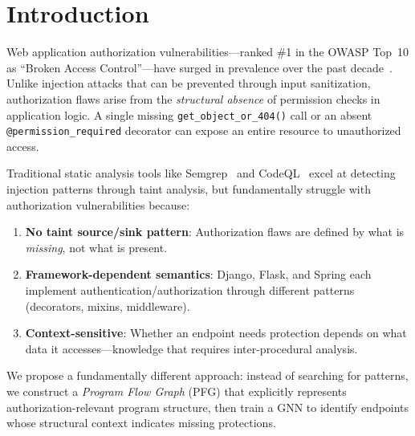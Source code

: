 \documentclass[conference]{IEEEtran}
\begin{document}
\section{Introduction}

Web application authorization vulnerabilities—ranked \#1 in the OWASP Top~10 as ``Broken Access Control''—have surged in prevalence over the past decade~\cite{owasp2021}. Unlike injection attacks that can be prevented through input sanitization, authorization flaws arise from the \emph{structural absence} of permission checks in application logic. A single missing \texttt{get\_object\_or\_404()} call or an absent \texttt{@permission\_required} decorator can expose an entire resource to unauthorized access.

Traditional static analysis tools like Semgrep~\cite{semgrep} and CodeQL~\cite{codeql} excel at detecting injection patterns through taint analysis, but fundamentally struggle with authorization vulnerabilities because:

\begin{enumerate}
    \item \textbf{No taint source/sink pattern}: Authorization flaws are defined by what is \emph{missing}, not what is present.
    \item \textbf{Framework-dependent semantics}: Django, Flask, and Spring each implement authentication/authorization through different patterns (decorators, mixins, middleware).
    \item \textbf{Context-sensitive}: Whether an endpoint needs protection depends on what data it accesses—knowledge that requires inter-procedural analysis.
\end{enumerate}

We propose a fundamentally different approach: instead of searching for patterns, we construct a \emph{Program Flow Graph} (PFG) that explicitly represents authorization-relevant program structure, then train a GNN to identify endpoints whose structural context indicates missing protections.
\end{document}
